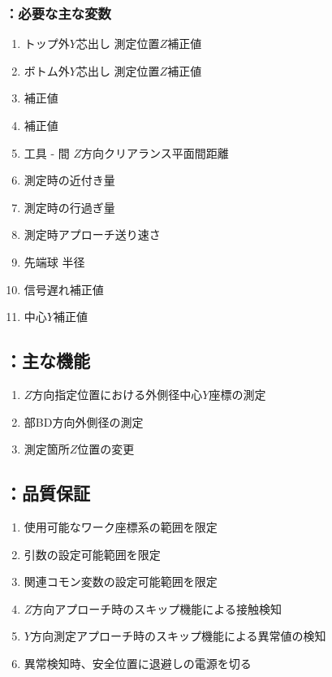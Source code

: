 \subsubsection{\MYOThickness：必要な主な変数}
\begin{enumerate}[label*=\sarrow]
\item トップ外$Y$芯出し 測定位置$Z$補正値
\item ボトム外$Y$芯出し 測定位置$Z$補正値
\item \KeywayPos 補正値
\item \KeywayWidth 補正値
\item 工具 - \EndFace 間 $Z$方向クリアランス平面間距離
\item \TouchSensorProbe 測定時の近付き量
\item \TouchSensorProbe 測定時の行過ぎ量
\item \TouchSensorProbe 測定時アプローチ送り速さ
\item \TouchSensorProbe 先端球 半径
\item \TouchSensorProbe 信号遅れ補正値
\item \TouchSensorProbe 中心$Y$補正値
\end{enumerate}


\clearpage
\subsection{\MYOThickness：主な機能}
\begin{enumerate}[label*=\sarrow]
\item $Z$方向指定位置における外側径中心$Y$座標の測定
\item \EndFace 部BD方向外側径の測定
\item 測定箇所$Z$位置の変更
\end{enumerate}


\subsection{\MYOThickness：品質保証}
\begin{enumerate}[label*=\sarrow]
\item 使用可能なワーク座標系の範囲を限定
\item {}引数の設定可能範囲を限定
\item 関連コモン変数の設定可能範囲を限定
\item $Z$方向アプローチ時のスキップ機能による接触検知
\item $Y$方向測定アプローチ時のスキップ機能による異常値の検知
\item 異常検知時、安全位置に退避し\TouchSensorProbe の電源を切る
\end{enumerate}




